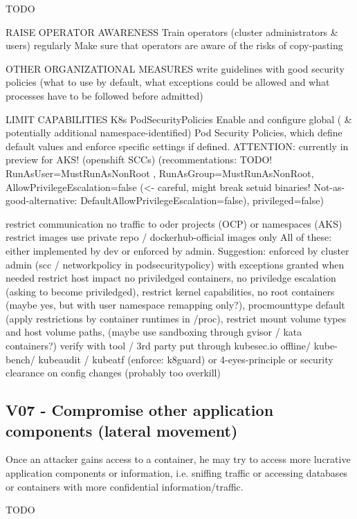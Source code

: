 TODO

RAISE OPERATOR AWARENESS
	Train operators (cluster administrators \& users) regularly									
	Make sure that operators are aware of the risks of copy-pasting									
										
OTHER ORGANIZATIONAL MEASURES
	write guidelines with good security policies (what to use by default, what exceptions could be allowed and what processes have to be followed before admitted)	

LIMIT CAPABILITIES
	K8s PodSecurityPolicies			Enable and configure global ( \& potentially additional namespace-identified) Pod Security Policies, which define default values and enforce specific settings if defined. ATTENTION: currently in preview for AKS!						
	(openshift SCCs)			(recommentations: TODO! RunAsUser=MustRunAsNonRoot , RunAsGroup=MustRunAsNonRoot, AllowPrivilegeEscalation=false (<- careful, might break setuid binaries! Not-as-good-alternative: DefaultAllowPrivilegeEscalation=false), privileged=false)						
										
	restrict communication			no traffic to oder projects (OCP) or namespaces (AKS)						
	restrict images			use private repo / dockerhub-official images only						All of these: either implemented by dev or enforced by admin. Suggestion: enforced by cluster admin (scc / networkpolicy in podsecuritypolicy) with exceptions granted when needed
	restrict host impact			no priviledged containers, no priviledge escalation (asking to become priviledged), restrict kernel capabilities, no root containers (maybe yes, but with user namespace remapping only?), procmounttype default (apply restrictions by container runtimes in /proc), restrict mount volume types and host volume paths, (maybe use sandboxing through gvisor / kata containers?)						
	verify with tool / 3rd party			put through kubesec.io offline/ kube-bench/ kubeaudit / kubeatf (enforce: k8guard) or 4-eyes-principle or security clearance on config changes (probably too overkill)						


\subsection{V07 - Compromise other application components (lateral movement)}
Once an attacker gains access to a container, he may try to access more lucrative application components or information, i.e. sniffing traffic or accessing databases or containers with more confidential information/traffic.

TODO


